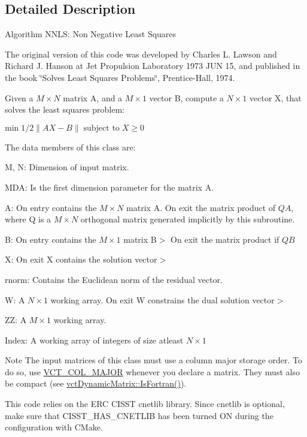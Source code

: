 \subsection{Detailed Description}
Algorithm N\+N\+L\+S\+: Non Negative Least Squares

The original version of this code was developed by Charles L. Lawson and Richard J. Hanson at Jet Propulsion Laboratory 1973 J\+U\+N 15, and published in the book \char`\"{}\+Solves Least Squares Problems\char`\"{}, Prentice-\/\+Hall, 1974.

Given a $ M \times N$ matrix A, and a $ M \times 1 $ vector B, compute a $ N \times 1 $ vector X, that solves the least squares problem\+:

$ \mbox{min} \; 1 / 2 \| AX - B \| \; \mbox{subject to} \; X \geq 0$

The data members of this class are\+:
\begin{DoxyItemize}
\item M, N\+: Dimension of input matrix.
\item M\+D\+A\+: Is the first dimension parameter for the matrix A.
\item A\+: On entry contains the $ M \times N $ matrix A. On exit the matrix product of $ QA $, where Q is a $ M \times N $ orthogonal matrix generated implicitly by this subroutine.
\item B\+: On entry contains the $ M \times 1 $ matrix B$>$ On exit the matrix product if $ QB $
\item X\+: On exit X contains the solution vector$>$
\item rnorm\+: Contains the Euclidean norm of the residual vector.
\item W\+: A $ N \times 1 $ working array. On exit W constrains the dual solution vector$>$
\item Z\+Z\+: A $ M \times 1 $ working array.
\item Index\+: A working array of integers of size atleast $ N \times 1 $
\end{DoxyItemize}

\begin{DoxyNote}{Note}
The input matrices of this class must use a column major storage order. To do so, use \hyperlink{vct_forward_declarations_8h_a432cdf8923afaf82f551450ad4034746}{V\+C\+T\+\_\+\+C\+O\+L\+\_\+\+M\+A\+J\+O\+R} whenever you declare a matrix. They must also be compact (see \hyperlink{classvct_dynamic_const_matrix_base_aac5f19015b4888f760f99daa4bac199c}{vct\+Dynamic\+Matrix\+::\+Is\+Fortran()}).

This code relies on the E\+R\+C C\+I\+S\+S\+T cnetlib library. Since cnetlib is optional, make sure that C\+I\+S\+S\+T\+\_\+\+H\+A\+S\+\_\+\+C\+N\+E\+T\+L\+I\+B has been turned O\+N during the configuration with C\+Make. 
\end{DoxyNote}


